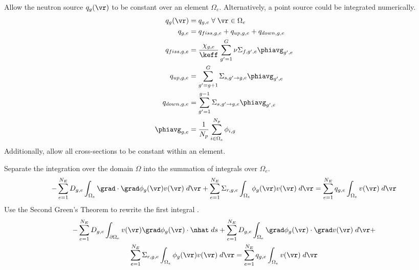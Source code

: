 \begin{frame}
  Allow the neutron source $q_g(\vr)$ to be constant over an element $\Omega_e$.
  Alternatively, a point source could be integrated numerically.
  \begin{align}
    q_g(\vr) &= q_{g,e} \; \forall \; \vr \in \Omega_e \\
    q_{g,e} &= q_{fiss,g,e} + q_{up,g,e} + q_{down,g,e} \\
    \label{eq:qelement_fiss}
    q_{fiss,g,e} &= \frac{\chi_{g,e}}{\keff} \sum_{g'=1}^G \nu
      \Sigma_{f,g',e} \phiavg_{g',e} \\
    \label{eq:qelement_up}
    q_{up,g,e} &= \sum_{g'=g+1}^G \Sigma_{s,g' \rightarrow g,e}
      \phiavg_{g',e}\\
    \label{eq:qelement_down}
    q_{down,g,e} &= \sum_{g'=1}^{g-1} \Sigma_{s,g' \rightarrow g,e}
      \phiavg_{g',e}\\
    \phiavg_{g,e} &= \frac{1}{N_p} \sum_{i \in \Omega_e}^{N_p} \phi_{i,g}
  \end{align}
  Additionally, allow all cross-sections to be constant within an element.
\end{frame}

\begin{frame}
  Separate the integration over the domain $\Omega$ into the summation of
  integrals over $\Omega_e$.
  \begin{equation} 
    \label{eq:element_by_element}
    -\sum_{e=1}^{N_E} D_{g,e} 
      \int_{\Omega_e} \grad \cdot \grad \phi_g(\vr) v(\vr) \; d\vr +
      \sum_{e=1}^{N_E} \Sigma_{r,g,e} \int_{\Omega_e} \phi_g(\vr) v(\vr) 
      \;d\vr = \sum_{e=1}^{N_E} q_{g,e} \int_{\Omega_e} v(\vr) 
      \; d\vr
  \end{equation}
  Use the Second Green's Theorem to rewrite the first integral
  \cite{textbookli}.
  \begin{multline} 
    -\sum_{e=1}^{N_E} D_{g,e} \int_{\partial \Omega_e} v(\vr) \grad
    \phi_g(\vr) \cdot \nhat \;ds + \sum_{e=1}^{N_E} 
      D_{g,e} \int_{\Omega_e} \grad \phi_g(\vr) \cdot \grad v(\vr) 
      \; d\vr + \\
      \sum_{e=1}^{N_E} \Sigma_{r,g,e} \int_{\Omega_e} \phi_g(\vr) v(\vr) 
     \; d\vr =
      \sum_{e=1}^{N_E} q_{g,e} \int_{\Omega_e} v(\vr) \; d\vr
  \end{multline}
\end{frame}

